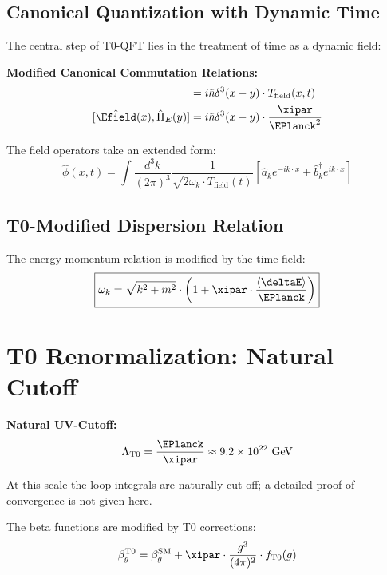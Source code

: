 	\subsection{Canonical Quantization with Dynamic Time}
	The central step of T0-QFT lies in the treatment of time as a dynamic field:
	\begin{tcolorbox}[colback=green!5!white,colframe=green!75!black,title={T0 Canonical Quantization}]
		\textbf{Modified Canonical Commutation Relations:}
		\begin{align}
			[\hat{\phi}(x), \hat{\pi}(y)] &= i\hbar \delta^3(x-y) \cdot T_{\text{field}}(x,t) \\
			[\hat{\Efield}(x), \hat{\Pi}_E(y)] &= i\hbar \delta^3(x-y) \cdot \frac{\xipar}{\EPlanck^2}
		\end{align}
	\end{tcolorbox}
	The field operators take an extended form:
	\begin{equation}
		\hat{\phi}(x,t) = \int \frac{d^3k}{(2\pi)^3} \frac{1}{\sqrt{2\omega_k \cdot T_{\text{field}}(t)}} \left[\hat{a}_k e^{-ik \cdot x} + \hat{b}^\dagger_k e^{ik \cdot x}\right]
	\end{equation}
	\subsection{T0-Modified Dispersion Relation}
	The energy-momentum relation is modified by the time field:
	\begin{equation}
		\boxed{\omega_k = \sqrt{k^2 + m^2} \cdot \left(1 + \xipar \cdot \frac{\langle\deltaE\rangle}{\EPlanck}\right)}
	\end{equation}
	\section{T0 Renormalization: Natural Cutoff}
	\begin{tcolorbox}[colback=red!5!white,colframe=red!75!black,title={T0 Renormalization}]
		\textbf{Natural UV-Cutoff:}
		\begin{equation}
			\Lambda_{\text{T0}} = \frac{\EPlanck}{\xipar} \approx 9.2 \times 10^{22} \text{ GeV}
		\end{equation}

		At this scale the loop integrals are naturally cut off; a detailed proof of convergence is not given here.
	\end{tcolorbox}
	The beta functions are modified by T0 corrections:
	\begin{equation}
		\beta_g^{\text{T0}} = \beta_g^{\text{SM}} + \xipar \cdot \frac{g^3}{(4\pi)^2} \cdot f_{\text{T0}}(g)
	\end{equation}
